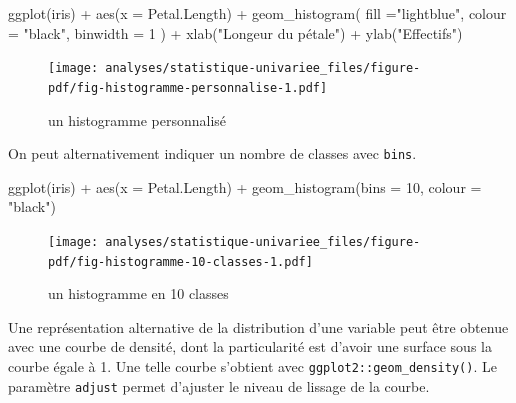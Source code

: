 \documentclass[
  letterpaper,
  DIV=11,
  numbers=noendperiod,
  oneside]{scrreprt}
\newenvironment{Shaded}{\begin{snugshade}}{\end{snugshade}}
\newcommand{\AttributeTok}[1]{\textcolor[rgb]{0.40,0.45,0.13}{#1}}
\newcommand{\DecValTok}[1]{\textcolor[rgb]{0.68,0.00,0.00}{#1}}
\newcommand{\FunctionTok}[1]{\textcolor[rgb]{0.28,0.35,0.67}{#1}}
\newcommand{\NormalTok}[1]{\textcolor[rgb]{0.00,0.23,0.31}{#1}}
\newcommand{\SpecialCharTok}[1]{\textcolor[rgb]{0.37,0.37,0.37}{#1}}
\newcommand{\StringTok}[1]{\textcolor[rgb]{0.13,0.47,0.30}{#1}}
\begin{document}
\begin{Shaded}
\begin{Highlighting}[]
\FunctionTok{ggplot}\NormalTok{(iris) }\SpecialCharTok{+}
  \FunctionTok{aes}\NormalTok{(}\AttributeTok{x =}\NormalTok{ Petal.Length) }\SpecialCharTok{+}
  \FunctionTok{geom\_histogram}\NormalTok{(}
    \AttributeTok{fill =}\StringTok{"lightblue"}\NormalTok{, }
    \AttributeTok{colour =} \StringTok{"black"}\NormalTok{, }
    \AttributeTok{binwidth =} \DecValTok{1}
\NormalTok{  ) }\SpecialCharTok{+}
  \FunctionTok{xlab}\NormalTok{(}\StringTok{"Longeur du pétale"}\NormalTok{) }\SpecialCharTok{+}
  \FunctionTok{ylab}\NormalTok{(}\StringTok{"Effectifs"}\NormalTok{)}
\end{Highlighting}
\end{Shaded}

\begin{figure}[H]

{\centering \texttt{[image: analyses/statistique-univariee\_files/figure-pdf/fig-histogramme-personnalise-1.pdf]}

}

\caption{\label{fig-histogramme-personnalise}un histogramme
personnalisé}

\end{figure}

On peut alternativement indiquer un nombre de classes avec
\texttt{bins}.

\begin{Shaded}
\begin{Highlighting}[]
\FunctionTok{ggplot}\NormalTok{(iris) }\SpecialCharTok{+}
  \FunctionTok{aes}\NormalTok{(}\AttributeTok{x =}\NormalTok{ Petal.Length) }\SpecialCharTok{+}
  \FunctionTok{geom\_histogram}\NormalTok{(}\AttributeTok{bins =} \DecValTok{10}\NormalTok{, }\AttributeTok{colour =} \StringTok{"black"}\NormalTok{)}
\end{Highlighting}
\end{Shaded}

\begin{figure}[H]

{\centering \texttt{[image: analyses/statistique-univariee\_files/figure-pdf/fig-histogramme-10-classes-1.pdf]}

}

\caption{\label{fig-histogramme-10-classes}un histogramme en 10 classes}

\end{figure}

Une représentation alternative de la distribution d'une variable peut
être obtenue avec une courbe de densité, dont la particularité est
d'avoir une surface sous la courbe égale à 1. Une telle courbe s'obtient
avec \texttt{ggplot2::geom\_density()}. Le paramètre \texttt{adjust}
permet d'ajuster le niveau de lissage de la courbe.
\end{document}
